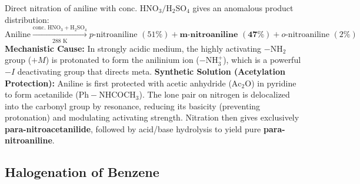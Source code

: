 \documentclass[10pt,a4paper]{article}
\begin{document}
\begin{ncertbox}
Direct nitration of aniline with conc. $\mathrm{HNO_3} / \mathrm{H_2SO_4}$ gives an anomalous product distribution:
\begin{equation}
  \text{Aniline} \xrightarrow[\text{288 K}]{\text{conc. } \mathrm{HNO_3} + \mathrm{H_2SO_4}} p\text{-nitroaniline } (51\%) + \mathbf{m}\textbf{-nitroaniline } (\mathbf{47\%}) + o\text{-nitroaniline } (2\%)
\end{equation}
\textbf{Mechanistic Cause:} In strongly acidic medium, the highly activating $-\mathrm{NH_2}$ group ($+M$) is protonated to form the anilinium ion ($-\mathrm{NH_3^+}$), which is a powerful $-I$ deactivating group that directs meta.
\textbf{Synthetic Solution (Acetylation Protection):} Aniline is first protected with acetic anhydride ($\mathrm{Ac_2O}$) in pyridine to form acetanilide ($\mathrm{Ph-NHCOCH_3}$). The lone pair on nitrogen is delocalized into the carbonyl group by resonance, reducing its basicity (preventing protonation) and modulating activating strength. Nitration then gives exclusively \textbf{para-nitroacetanilide}, followed by acid/base hydrolysis to yield pure \textbf{para-nitroaniline}.
\end{ncertbox}

\subsection{Halogenation of Benzene}
\end{document}
